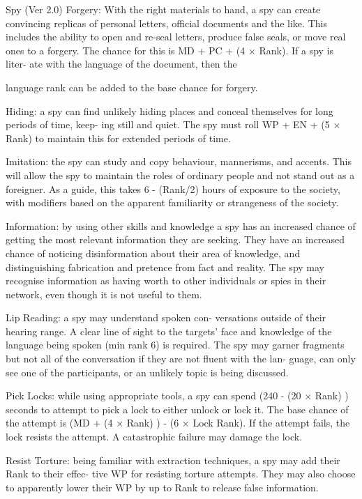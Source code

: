 \begin{Chapter}{Spy (Ver 2.0)}
Forgery:  With  the  right  materials  to  hand,  a  spy 
can  create  convincing  replicas  of  personal  letters, 
official  documents  and  the  like.  This  includes  the 
ability  to  open  and  re-seal  letters,  produce  false 
seals,  or  move  real  ones  to  a  forgery.  The  chance 
for this is MD + PC + (4 × Rank). If a spy is liter-
ate  with  the  language  of  the  document,  then  the 

language rank can be added to the base chance for 
forgery. 

Hiding:  a  spy  can  find unlikely  hiding  places  and 
conceal themselves for long periods of time, keep-
ing still and quiet. The spy must roll WP + EN + (5 
×  Rank)  to  maintain  this  for  extended  periods  of 
time. 

Imitation:  the  spy  can  study  and  copy  behaviour, 
mannerisms, and accents. This will allow the spy to 
maintain the roles of ordinary people and not stand 
out  as  a  foreigner.  As  a  guide,  this  takes  6  - 
(Rank/2)  hours  of  exposure  to  the  society,  with 
modifiers  based  on  the  apparent  familiarity  or 
strangeness of the society. 

Information: by using other skills and knowledge 
a  spy  has  an  increased  chance  of  getting  the  most 
relevant  information  they  are  seeking.  They  have 
an  increased  chance  of  noticing  disinformation 
about  their  area  of  knowledge,  and  distinguishing 
fabrication and pretence from fact and reality. The 
spy may recognise information as having worth to 
other  individuals  or  spies  in  their  network,  even 
though it is not useful to them. 

Lip  Reading:  a  spy  may  understand  spoken  con-
versations  outside  of  their  hearing  range.  A  clear 
line  of  sight  to the  targets’  face  and knowledge  of 
the language being spoken (min rank 6) is required. 
The  spy  may  garner  fragments  but  not  all  of  the 
conversation  if  they  are  not  fluent  with  the  lan-
guage,  can  only  see  one  of  the  participants,  or  an 
unlikely topic is being discussed. 

Pick  Locks:  while  using  appropriate  tools,  a  spy 
can spend (240 - (20 × Rank) ) seconds to attempt 
to pick a lock to either unlock or lock it. The base 
chance of the attempt is (MD + (4 × Rank) ) - (6 × 
Lock Rank). If the attempt fails, the lock resists the 
attempt.  A  catastrophic  failure  may  damage  the 
lock. 

Resist  Torture:  being  familiar  with  extraction 
techniques, a spy may add their Rank to their effec-
tive  WP  for  resisting  torture  attempts.  They  may 
also choose to apparently lower their WP by up to 
Rank to release false information. 


\end{Chapter}
